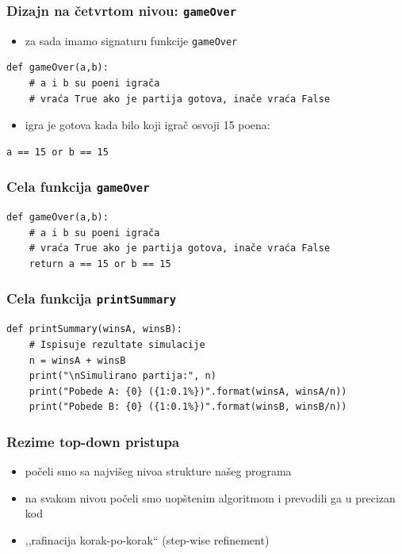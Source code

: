 \documentclass[utf8,compress]{beamer}
\begin{document}
\begin{frame}[fragile]
  \frametitle{Dizajn na četvrtom nivou: \texttt{gameOver}}
\begin{itemize}
  \item za sada imamo signaturu funkcije \texttt{gameOver}
\end{itemize}
\begin{verbatim}
def gameOver(a,b):
    # a i b su poeni igrača
    # vraća True ako je partija gotova, inače vraća False
\end{verbatim}
\begin{itemize}
  \item igra je gotova kada bilo koji igrač osvoji 15 poena:
\end{itemize}
\begin{verbatim}
a == 15 or b == 15
\end{verbatim}
\end{frame}

\begin{frame}[fragile]
  \frametitle{Cela funkcija \texttt{gameOver}}
\begin{verbatim}
def gameOver(a,b):
    # a i b su poeni igrača
    # vraća True ako je partija gotova, inače vraća False
    return a == 15 or b == 15
\end{verbatim}
\end{frame}

\begin{frame}[fragile,shrink=10]
  \frametitle{Cela funkcija \texttt{printSummary}}
\begin{verbatim}
def printSummary(winsA, winsB):
    # Ispisuje rezultate simulacije
    n = winsA + winsB
    print("\nSimulirano partija:", n)
    print("Pobede A: {0} ({1:0.1%})".format(winsA, winsA/n))
    print("Pobede B: {0} ({1:0.1%})".format(winsB, winsB/n))
\end{verbatim}
\end{frame}

\begin{frame}
  \frametitle{Rezime top-down pristupa}
\begin{itemize}
  \item počeli smo sa najvišeg nivoa strukture našeg programa
  \item na svakom nivou počeli smo uopštenim algoritmom i prevodili ga u precizan kod
  \item ,,rafinacija korak-po-korak`` (step-wise refinement)
\end{itemize}
\end{frame}
\end{document}
